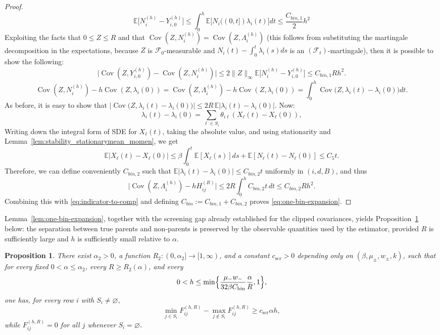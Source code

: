 \documentclass{article}
\newtheorem{proposition}{Proposition}[section]
\newcommand{\E}{\mathbb{E}}
\newcommand{\Cov}{\operatorname{Cov}}
\newcommand{\abs}[1]{\lvert #1\rvert}
\newcommand{\scr}{\mathrm{scr}}
\begin{document}
\begin{proof}
\[
\E\bigl[N_i^{(h)}-Y_{i,0}^{(h)}\bigr]\le \int_0^h \E\bigl[N_i((0,t])\lambda_i(t)\bigr]dt\le \frac{C_{bin,1}}{2}h^2
\]
Exploiting the facts that $0\le Z\le R$ and that  $\Cov(Z,N_i^{(h)})=\Cov(Z,\Lambda_i^{(h)})$ (this follows from substituting the martingale decomposition in the expectations, because $Z$ is $\mathcal F_0$-measurable and $N_i(t)-\int_0^t\lambda_i(s)ds$ is an $(\mathcal F_t)$-martingale), then it is possible to show the following:
\begin{equation}
\label{eq:indicator-to-comp}
\abs{\Cov(Z,Y_{i,0}^{(h)})-\Cov(Z,N_i^{(h)})}
\le 2\|Z\|_\infty\E\bigl[N_i^{(h)}-Y_{i,0}^{(h)}\bigr]
\le C_{bin,1} R h^2.
\end{equation}
\[
\Cov(Z,N_i^{(h)}) - h\Cov(Z,\lambda_i(0))=\Cov(Z,\Lambda_i^{(h)}) - h\Cov(Z,\lambda_i(0))
=
\int_0^h \Cov\bigl(Z,\lambda_i(t)-\lambda_i(0)\bigr)dt.
\]
As before, it is easy to show that $\abs{\Cov\bigl(Z,\lambda_i(t)-\lambda_i(0)\bigr)}
\le 2R\,\E\abs{\lambda_i(t)-\lambda_i(0)}$. Now:
\[
\lambda_i(t)-\lambda_i(0)=\sum_{\ell\in S_i} \theta_{i\ell}(X_\ell(t)-X_\ell(0)),
\]
Writing down the integral form of SDE for $X_\ell(t)$, taking the absolute value, and using stationarity and Lemma~\ref{lem:stability_stationarymean_momen}, we get 
\[
\E\abs{X_\ell(t)-X_\ell(0)}
\le \beta\int_0^t \E[X_\ell(s)]ds + \E[N_\ell(t)-N_\ell(0)]
\le C_5t.
\]
Therefore, we can define conveniently $C_{bin,2}$ such that $\E|\lambda_i(t)-\lambda_i(0)|\le C_{bin,2}t$ uniformly in $(i,d,B)$, and thus
\[
\abs{\Cov(Z,\Lambda_i^{(h)}) - hH_{ij}^{(R)}}
\le 2R\int_0^h C_{bin,2}t\,dt
\le C_{bin,2} R h^2.
\]
Combining this with \eqref{eq:indicator-to-comp} and defining $C_{bin}:=C_{bin,1}+C_{bin,2}$ proves \eqref{eq:one-bin-expansion}.
\end{proof}
Lemma~\ref{lem:one-bin-expansion}, together with the screening gap already established for the clipped covariances, yields Proposition~\ref{prop:one-bin-gap} below: the separation between true parents and non-parents is preserved by the observable quantities used by the estimator, provided $R$ is sufficiently large and $h$ is sufficiently small relative to $\alpha$.
\begin{proposition}
\label{prop:one-bin-gap}
There exist $\alpha_2>0$, a function $R_2:(0,\alpha_2]\to[1,\infty)$, and a constant $c_{\scr}>0$ depending only on $(\beta,\mu_{\pm},w_{\pm},k)$, such that for every fixed $0<\alpha\le \alpha_2$, every $R\ge R_2(\alpha)$, and every
\[
0<h\le \min\Bigl\{\frac{\mu_-w_-}{32\beta C_{\rm bin}}\frac{\alpha}{R}, 1\Bigr\},
\]
one has, for every row $i$ with $S_i\neq\varnothing$,
\begin{equation}
\label{eq:F-gap}
\min_{j\in S_i}F_{ij}^{(h,R)} - \max_{j\notin S_i}F_{ij}^{(h,R)}
\ge c_{\scr}\alpha h ,
\end{equation}
while $F_{ij}^{(h,R)}=0$ for all $j$ whenever $S_i=\varnothing$.
\end{proposition}
\end{document}
